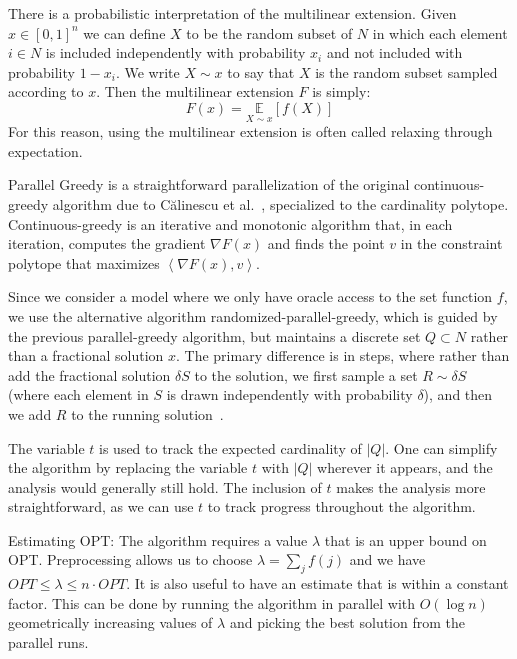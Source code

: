 \documentclass[11pt, a4paper]{article}
\begin{document}
There is a probabilistic interpretation of the multilinear extension. Given $x \in[0,1]^{n}$ we can define $X$ to be the random subset of $N$ in which each element $i \in N $ is included independently with probability $x_i$ and not included with probability $1 - x_i$. We write $X\sim x$ to say that $X$ is the random subset sampled according to $x$. Then the multilinear extension $F$ is simply:
\begin{equation}
    F(x)=\underset{X \sim x}{\mathbb{E}}[f(X)]
\end{equation}
For this reason, using the multilinear extension is often called relaxing through expectation.

Parallel Greedy is a straightforward parallelization of the original continuous-greedy algorithm due to Călinescu et al.~\cite{CGC11}, specialized to the cardinality polytope. Continuous-greedy is an iterative and monotonic algorithm that, in each iteration, computes the gradient $\nabla F(x)$ and finds the point $v$ in the constraint polytope that maximizes
$\left<\nabla F(x), v\right>$. 

Since we consider a model where we only have oracle access to the set function $f$, we use the alternative algorithm randomized-parallel-greedy, which is guided by the previous parallel-greedy algorithm, but maintains a discrete set $Q \subset N$ rather than a fractional solution $x$. The primary difference is in steps, where rather than add the fractional solution $\delta S$ to the solution, we first sample a set $R\sim\delta S$ (where each element in $S$ is drawn independently with probability $\delta$), and then we add $R$ to the running solution~\cite{chekuri2018submodular}.

The variable $t$ is used to track the expected cardinality of $|Q|$. One can simplify the algorithm by replacing the variable $t$ with $|Q|$ wherever it appears, and the analysis would generally still hold. The inclusion of $t$ makes the analysis more straightforward, as we can use $t$ to track progress throughout the algorithm.


Estimating OPT: The algorithm requires a value $\lambda$ that is an upper bound on OPT. Preprocessing allows us to choose $\lambda=\sum_{j} f(j)$ and we have $OPT \leq \lambda \leq n\cdot OPT$. It is also useful to have an estimate that is within a constant factor. This can be done by running the algorithm in parallel with $O(\log n)$ geometrically increasing values of $\lambda$ and picking the best solution from the parallel runs.
\end{document}
